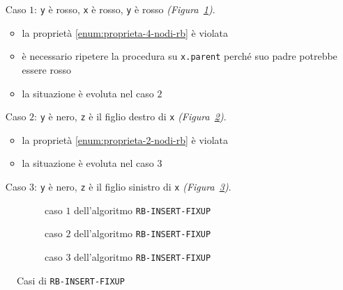 \documentclass[italian, 10pt]{article}
\begin{document}
\begin{itemize}
  \item[Caso \(1\):] \texttt{y} è rosso, \texttt{x} è rosso, \texttt{y} è rosso \textit{(Figura~\ref{fig:caso-1-algoritmo-rb-insert-fixup})}.
    \begin{itemize}
      \item la proprietà \ref{enum:proprieta-4-nodi-rb} è violata
      \item è necessario ripetere la procedura su \texttt{x.parent} perché suo padre potrebbe essere rosso
      \item la situazione è evoluta nel caso \(2\)
    \end{itemize}
  \item[Caso \(2\):] \texttt{y} è nero, \texttt{z} è il figlio destro di \texttt{x} \textit{(Figura~\ref{fig:caso-2-algoritmo-rb-insert-fixup})}.
    \begin{itemize}
      \item la proprietà \ref{enum:proprieta-2-nodi-rb} è violata
      \item la situazione è evoluta nel caso \(3\)
    \end{itemize}
  \item[Caso \(3\):] \texttt{y} è nero, \texttt{z} è il figlio sinistro di \texttt{x} \textit{(Figura~\ref{fig:caso-3-algoritmo-rb-insert-fixup})}.
\end{itemize}

\begin{figure}[htbp]
  \begin{subfigure}{\textwidth}
    \centering
    \bigskip
    \caption{caso \(1\) dell'algoritmo \texttt{RB-INSERT-FIXUP}}
    \label{fig:caso-1-algoritmo-rb-insert-fixup}
    \bigskip
  \end{subfigure}
  \begin{subfigure}{\textwidth}
    \centering
    \bigskip
    \caption{caso \(2\) dell'algoritmo \texttt{RB-INSERT-FIXUP}}
    \label{fig:caso-2-algoritmo-rb-insert-fixup}
    \bigskip
  \end{subfigure}
  \begin{subfigure}{\textwidth}
    \centering
    \bigskip
    \caption{caso \(3\) dell'algoritmo \texttt{RB-INSERT-FIXUP}}
    \label{fig:caso-3-algoritmo-rb-insert-fixup}
    \bigskip
  \end{subfigure}
  \caption{Casi di \texttt{RB-INSERT-FIXUP}}
  \label{fig:casi-algoritmo-rb-insert-fixup}
\end{figure}
\end{document}
